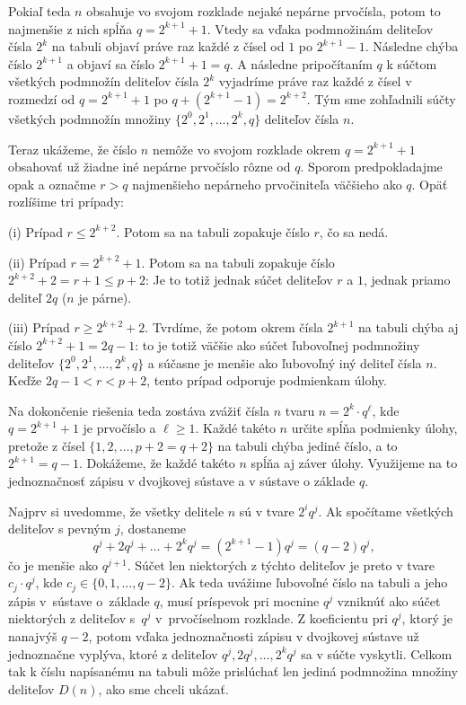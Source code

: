 {\smallskip\noindent
Pokiaľ teda $n$ obsahuje vo svojom rozklade nejaké nepárne prvočísla, potom to najmenšie z nich spĺňa $q= 2^{k + 1}+1$. Vtedy sa vďaka podmnožinám deliteľov čísla $2^k$ na tabuli objaví práve raz každé z čísel od $1$ po $2^{k+1}-1$.
Následne chýba číslo $2^{k+1}$ a objaví sa číslo $2^{k+1}+1=q$.
A následne pripočítaním $q$ k súčtom všetkých podmnožín deliteľov čísla $2^k$ vyjadríme práve raz každé z čísel v rozmedzí od $q=2^{k +1}+1$ po $q+(2^{k +1}-1) = 2^{k+2}$. Tým sme zohľadnili súčty všetkých podmnožín množiny $\{2^0,2^1,\ldots,2^k, q\}$ deliteľov čísla $n$.

Teraz ukážeme, že číslo $n$ nemôže vo svojom rozklade okrem $q= 2^{k + 1}+1$ obsahovať už žiadne iné nepárne prvočíslo rôzne od $q$. Sporom predpokladajme opak a označme $r>q$ najmenšieho nepárneho prvočiniteľa väčšieho ako $q$.
Opäť rozlíšime tri prípady:

\smallskip
\item{(i)} Prípad $r\le 2^{k+2}$. Potom sa na tabuli zopakuje číslo $r$, čo sa nedá.
\item{(ii)} Prípad $r= 2^{k+2}+1$. Potom sa na tabuli zopakuje číslo $2^{k+2}+2=r+1\le p+2$: Je to totiž jednak súčet deliteľov $r$ a $1$, jednak priamo deliteľ $2q$ ($n$ je párne).
\item{(iii)} Prípad $r\ge 2^{k+2}+2$. Tvrdíme, že potom okrem čísla $2^{k+1}$ na tabuli chýba aj číslo $2^{k+2}+1=2q-1$: to je totiž väčšie ako súčet ľubovoľnej podmnožiny deliteľov $\{2^0,2^1,\ldots,2^k, q\}$ a súčasne je menšie ako ľubovoľný iný deliteľ čísla $n$. Keďže ${2q-1}<r<p+2$, tento prípad odporuje podmienkam úlohy.

\smallskip\noindent
Na dokončenie riešenia teda zostáva zvážiť čísla $n$ tvaru $n=2^k\cdot q^\ell$, kde $q=2^{k + 1}+1$ je prvočíslo a $\ell\ge 1$.
Každé takéto $n$ určite spĺňa podmienky úlohy, pretože z čísel $\{1,2,\ldots,p+2=q+2\}$ na tabuli chýba jediné číslo, a to $2^{k+1}=q-1$.
Dokážeme, že každé takéto $n$ spĺňa aj záver úlohy.
Využijeme na to jednoznačnosť zápisu v dvojkovej sústave a v sústave o základe $q$.

Najprv si uvedomme, že všetky delitele $n$ sú v tvare $2^iq^j$.
Ak spočítame všetkých deliteľov s pevným $j$, dostaneme
$$q^j+2q^j+\ldots+2^kq^j=(2^{k+1}-1)q^j=(q-2)q^j,$$
čo je menšie ako $q^{j+1}$.
Súčet len niektorých z týchto deliteľov je preto v tvare $c_j\cdot q^j$, kde $c_j\in\{0,1,\ldots,q-2\}$.
Ak teda uvážime ľubovoľné číslo na tabuli a jeho zápis v~sústave o~základe $q$, musí príspevok pri mocnine $q^j$ vzniknúť ako súčet niektorých z deliteľov s~$q^j$ v~prvočíselnom rozklade.
Z koeficientu pri $q^j$, ktorý je nanajvýš $q-2$, potom vďaka jednoznačnosti zápisu v dvojkovej sústave už jednoznačne vyplýva, ktoré z deliteľov $q^j,2q^j,\ldots,2^kq^j$ sa v súčte vyskytli.
Celkom tak k číslu napísanému na tabuli môže prislúchať len jediná podmnožina množiny deliteľov $D(n)$, ako sme chceli ukázať.

}
